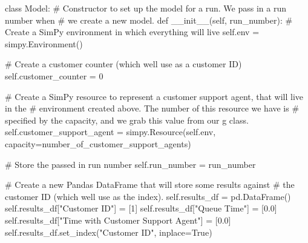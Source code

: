 \documentclass[
  letterpaper,
  DIV=11,
  numbers=noendperiod]{scrreprt}
\newenvironment{Shaded}{}{}
\newcommand{\CommentTok}[1]{\textcolor[rgb]{0.42,0.45,0.49}{#1}}
\newcommand{\DecValTok}[1]{\textcolor[rgb]{0.00,0.36,0.77}{#1}}
\newcommand{\FloatTok}[1]{\textcolor[rgb]{0.00,0.36,0.77}{#1}}
\newcommand{\FunctionTok}[1]{\textcolor[rgb]{0.44,0.26,0.76}{#1}}
\newcommand{\KeywordTok}[1]{\textcolor[rgb]{0.84,0.23,0.29}{#1}}
\newcommand{\NormalTok}[1]{\textcolor[rgb]{0.14,0.16,0.18}{#1}}
\newcommand{\OperatorTok}[1]{\textcolor[rgb]{0.14,0.16,0.18}{#1}}
\newcommand{\StringTok}[1]{\textcolor[rgb]{0.01,0.18,0.38}{#1}}
\newcommand{\VariableTok}[1]{\textcolor[rgb]{0.89,0.38,0.04}{#1}}
\begin{document}
\begin{tcolorbox}[enhanced jigsaw, colframe=quarto-callout-note-color-frame, bottomtitle=1mm, breakable, rightrule=.15mm, coltitle=black, colbacktitle=quarto-callout-note-color!10!white, opacityback=0, leftrule=.75mm, arc=.35mm, toptitle=1mm, title=\textcolor{quarto-callout-note-color}{\faInfo}\hspace{0.5em}{Full Example model class}, titlerule=0mm, colback=white, toprule=.15mm, bottomrule=.15mm, left=2mm, opacitybacktitle=0.6]

\begin{Shaded}
\begin{Highlighting}[]
\KeywordTok{class}\NormalTok{ Model:}
    \CommentTok{\# Constructor to set up the model for a run.  We pass in a run number when}
    \CommentTok{\# we create a new model.}
    \KeywordTok{def} \FunctionTok{\_\_init\_\_}\NormalTok{(}\VariableTok{self}\NormalTok{, run\_number):}
        \CommentTok{\# Create a SimPy environment in which everything will live}
        \VariableTok{self}\NormalTok{.env }\OperatorTok{=}\NormalTok{ simpy.Environment()}

        \CommentTok{\# Create a customer counter (which we\textquotesingle{}ll use as a customer ID)}
        \VariableTok{self}\NormalTok{.customer\_counter }\OperatorTok{=} \DecValTok{0}

        \CommentTok{\# Create a SimPy resource to represent a customer support agent, that will live in the}
        \CommentTok{\# environment created above.  The number of this resource we have is}
        \CommentTok{\# specified by the capacity, and we grab this value from our g class.}
        \VariableTok{self}\NormalTok{.customer\_support\_agent }\OperatorTok{=}\NormalTok{ simpy.Resource(}\VariableTok{self}\NormalTok{.env, capacity}\OperatorTok{=}\NormalTok{number\_of\_customer\_support\_agents)}

        \CommentTok{\# Store the passed in run number}
        \VariableTok{self}\NormalTok{.run\_number }\OperatorTok{=}\NormalTok{ run\_number}

        \CommentTok{\# Create a new Pandas DataFrame that will store some results against}
        \CommentTok{\# the customer ID (which we\textquotesingle{}ll use as the index).}
        \VariableTok{self}\NormalTok{.results\_df }\OperatorTok{=}\NormalTok{ pd.DataFrame()}
        \VariableTok{self}\NormalTok{.results\_df[}\StringTok{"Customer ID"}\NormalTok{] }\OperatorTok{=}\NormalTok{ [}\DecValTok{1}\NormalTok{]}
        \VariableTok{self}\NormalTok{.results\_df[}\StringTok{"Queue Time"}\NormalTok{] }\OperatorTok{=}\NormalTok{ [}\FloatTok{0.0}\NormalTok{]}
        \VariableTok{self}\NormalTok{.results\_df[}\StringTok{"Time with Customer Support Agent"}\NormalTok{] }\OperatorTok{=}\NormalTok{ [}\FloatTok{0.0}\NormalTok{]}
        \VariableTok{self}\NormalTok{.results\_df.set\_index(}\StringTok{"Customer ID"}\NormalTok{, inplace}\OperatorTok{=}\VariableTok{True}\NormalTok{)}


\end{Highlighting}
\end{Shaded}
\end{tcolorbox}
\end{document}
